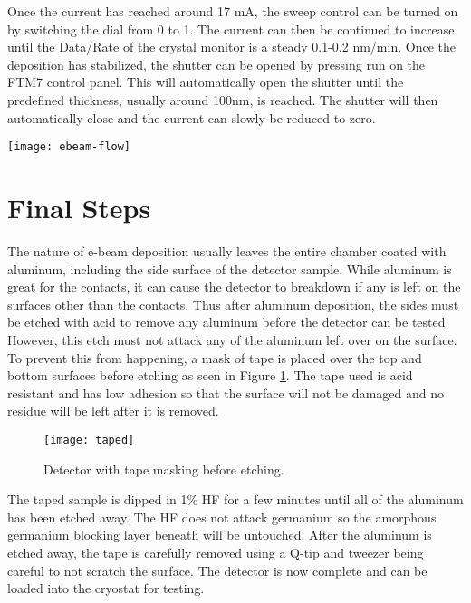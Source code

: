 Once the current has reached around 17 mA, the sweep control can be turned on by switching the dial from 0 to 1.
The current can then be continued to increase until the Data/Rate of the crystal monitor is a steady 0.1-0.2 nm/min.
Once the deposition has stabilized, the shutter can be opened by pressing run on the FTM7 control panel.
This will automatically open the shutter until the predefined thickness, usually around 100nm, is reached.
The shutter will then automatically close and the current can slowly be reduced to zero.

\begin{sidewaysfigure}
\texttt{[image: ebeam-flow]}
\caption{This is a diagram of the of the electron beam machine.It is used to deposit aluminum onto the detector sample.}
\label{fig:ebeam-flow}
\end{sidewaysfigure}

\section{Final Steps}
The nature of e-beam deposition usually leaves the entire chamber coated with aluminum, including the side surface of the detector sample.
While aluminum is great for the contacts, it can cause the detector to breakdown if any is left on the surfaces other than the contacts.
Thus after aluminum deposition, the sides must be etched with acid to remove any aluminum before the detector can be tested.
However, this etch must not attack any of the aluminum left over on the surface.
To prevent this from happening, a mask of tape is placed over the top and bottom surfaces before etching as seen in Figure \ref{fig:taped}.
The tape used is acid resistant and has low adhesion so that the surface will not be damaged and no residue will be left after it is removed.
\begin{figure}[htpb]
\centering
\texttt{[image: taped]}
\caption{Detector with tape masking before etching.}
\label{fig:taped}
\end{figure}

The taped sample is dipped in 1\% HF for a few minutes until all of the aluminum has been etched away.
The HF does not attack germanium so the amorphous germanium blocking layer beneath will be untouched.
After the aluminum is etched away, the tape is carefully removed using a Q-tip and tweezer being careful to not scratch the surface.
The detector is now complete and can be loaded into the cryostat for testing.



